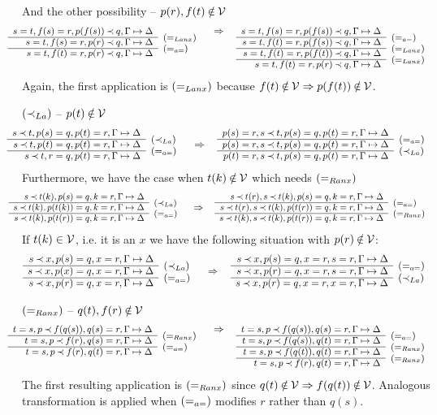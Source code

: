 \begin{PROOF}
\begin{LS}
And the other possibility -- $p(r), f(t)\not\in\Vars$
\[ \sma{ \prar{
s=t, f(s)=r, p(f(s))\Incl q, \GSD \cl
s=t, f(s)=r, p(r)\Incl q, \GSD & \rabove{\eLanx} \cl
s=t, f(t)=r, p(r)\Incl q, \GSD & \rabove{\eae} 
}\conv
\prar{
s=t, f(s)=r, p(f(s))\Incl q, \GSD \cl
s=t, f(t)=r, p(f(s))\Incl q, \GSD & \rabove{\eae} \cl
s=t, f(t)=r, p(f(t))\Incl q, \GSD & \rabove{\eLanx} \cl
s=t, f(t)=r, p(r)\Incl q, \GSD & \rabove{\eLanx} 
} }  %
\] 
Again, the first application is $(=_{Lanx})$ because 
$f(t)\not\in\Vars\impl p(f(t))\not\in\Vars$.
%
\item $(\mathbin{\prec}_{La})$ -- $p(t)\not\in\Vars$
\[\sma{\prarc{
s\Incl t, p(s)=q, p(t)=r, \GSD \cl
s\Incl t, p(t)=q, p(t)=r, \GSD & \rabove{\iLa} \cl
s\Incl t, r=q, p(t)=r, \GSD & \rabove{\eae} 
}\conv
\prarc{
p(s)= r, s\Incl t, p(s)=q, p(t)=r, \GSD \cl
p(s)= r, s\Incl t, p(s)=q, p(t)=r, \GSD & \rabove{\eae} \cl
p(t)= r, s\Incl t, p(s)=q, p(t)=r, \GSD & \rabove{\iLa} 
} }
\]
Furthermore, we have the case when $t(k)\not\in\Vars$ which needs $(=_{Ranx})$
\[\sma{ \prarc{
s\Incl t(k), p(s)=q, k=r, \GSD \cl
s\Incl t(k), p(t(k))=q, k=r, \GSD & \rabove{\iLa} \cl
s\Incl t(k), p(t(r))=q, k=r, \GSD & \rabove{\eae}
}\conv
\prarc{
s\Incl t(r), s\Incl t(k), p(s)=q, k=r, \GSD \cl
s\Incl t(r), s\Incl t(k), p(t(r))=q, k=r, \GSD & \rabove{\eae} \cl
s\Incl t(k), s\Incl t(k), p(t(r))=q, k=r, \GSD & \rabove{\eRanx}
} }
\]
If $t(k)\in{\cal V}$, i.e. it is an $x$ we have the following situation with 
$p(r)\not\in\Vars$:
\[\prarc{
s\Incl x, p(s)=q, x=r, \GSD \cl
s\Incl x, p(x)=q, x=r, \GSD & \rabove{\iLa} \cl
s\Incl x, p(r)=q, x=r, \GSD & \rabove{\eae}
}\conv
\prarc{
s\Incl x, p(s)=q, x=r, s=r, \GSD \cl
s\Incl x, p(r)=q, x=r, s=r, \GSD & \rabove{\eae} \cl
s\Incl x, p(r)=q, x=r, x=r, \GSD & \rabove{\iLa}
}
\]
\item $(=_{Ranx})$ -- $q(t), f(r)\not\in\Vars$
\[\sma{ \prar{
t=s, p\Incl f(q(s)), q(s)=r, \GSD \cl
t=s, p\Incl f(r), q(s)=r, \GSD & \rabove{\eRanx} \cl
t=s, p\Incl f(r), q(t)=r, \GSD & \rabove{\eae} 
}\conv
\prar{
t=s, p\Incl f(q(s)), q(s)=r, \GSD \cl
t=s, p\Incl f(q(s)), q(t)=r, \GSD & \rabove{\eae} \cl
t=s, p\Incl f(q(t)), q(t)=r, \GSD & \rabove{\eRanx} \cl
t=s, p\Incl f(r), q(t)=r, \GSD & \rabove{\eRanx}
} }
\]
The first resulting application is $(=_{Ranx})$ since 
$q(t)\not\in\Vars\impl f(q(t))\not\in\Vars$.
Analogous transformation is applied when $(=_{a=})$ modifies $r$ rather than $q(s)$.

\end{LS}
\end{PROOF}
